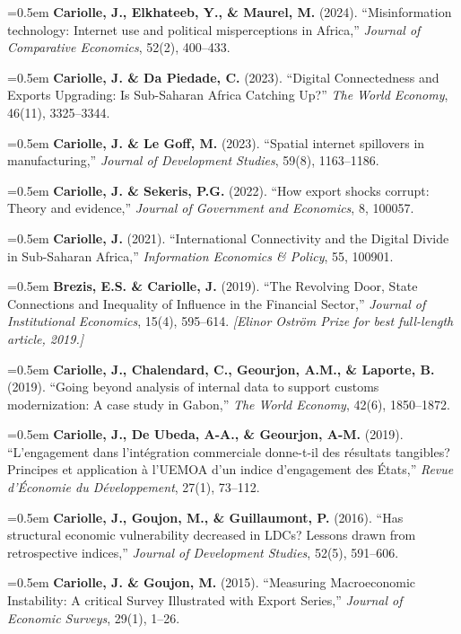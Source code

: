 \documentclass[11pt, a4paper]{article}
\newcommand{\cvpub}[1]{\noindent\hangindent=0.5em\hangafter=1 #1\par\vspace{5pt}}
\begin{document}
\cvpub{\textbf{Cariolle, J., Elkhateeb, Y., \& Maurel, M.} (2024). ``Misinformation technology: Internet use and political misperceptions in Africa,'' \textit{Journal of Comparative Economics}, 52(2), 400--433.}

\cvpub{\textbf{Cariolle, J. \& Da Piedade, C.} (2023). ``Digital Connectedness and Exports Upgrading: Is Sub-Saharan Africa Catching Up?'' \textit{The World Economy}, 46(11), 3325--3344.}

\cvpub{\textbf{Cariolle, J. \& Le Goff, M.} (2023). ``Spatial internet spillovers in manufacturing,'' \textit{Journal of Development Studies}, 59(8), 1163--1186.}

\cvpub{\textbf{Cariolle, J. \& Sekeris, P.G.} (2022). ``How export shocks corrupt: Theory and evidence,'' \textit{Journal of Government and Economics}, 8, 100057.}

\cvpub{\textbf{Cariolle, J.} (2021). ``International Connectivity and the Digital Divide in Sub-Saharan Africa,'' \textit{Information Economics \& Policy}, 55, 100901.}

\cvpub{\textbf{Brezis, E.S. \& Cariolle, J.} (2019). ``The Revolving Door, State Connections and Inequality of Influence in the Financial Sector,'' \textit{Journal of Institutional Economics}, 15(4), 595--614. \textit{[Elinor Ostr\"{o}m Prize for best full-length article, 2019.]}}

\cvpub{\textbf{Cariolle, J., Chalendard, C., Geourjon, A.M., \& Laporte, B.} (2019). ``Going beyond analysis of internal data to support customs modernization: A case study in Gabon,'' \textit{The World Economy}, 42(6), 1850--1872.}

\cvpub{\textbf{Cariolle, J., De Ubeda, A-A., \& Geourjon, A-M.} (2019). ``L'engagement dans l'int\'{e}gration commerciale donne-t-il des r\'{e}sultats tangibles? Principes et application \`{a} l'UEMOA d'un indice d'engagement des \'{E}tats,'' \textit{Revue d'\'{E}conomie du D\'{e}veloppement}, 27(1), 73--112.}

\cvpub{\textbf{Cariolle, J., Goujon, M., \& Guillaumont, P.} (2016). ``Has structural economic vulnerability decreased in LDCs? Lessons drawn from retrospective indices,'' \textit{Journal of Development Studies}, 52(5), 591--606.}

\cvpub{\textbf{Cariolle, J. \& Goujon, M.} (2015). ``Measuring Macroeconomic Instability: A critical Survey Illustrated with Export Series,'' \textit{Journal of Economic Surveys}, 29(1), 1--26.}
\newpage
\end{document}
